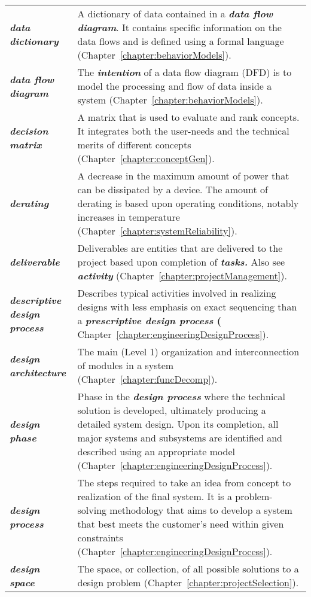 \begin{longtable} { p{3cm} p{11cm}}
\emph{\textbf{data dictionary}} & A dictionary of data contained in a
\emph{\textbf{data flow diagram}}. It contains specific information on
the data flows and is defined using a formal language (Chapter~\ref{chapter:behaviorModels}). \B \\
\emph{\textbf{data flow diagram}} & The \emph{\textbf{intention}} of a
data flow diagram (DFD) is to model the processing and flow of data
inside a system (Chapter~\ref{chapter:behaviorModels}). \B \\
\emph{\textbf{decision matrix}} & A matrix that is used to evaluate and
rank concepts. It integrates both the user-needs and the technical
merits of different concepts (Chapter~\ref{chapter:conceptGen}). \B \\
\emph{\textbf{derating}} & A decrease in the maximum amount of power
that can be dissipated by a device. The amount of derating is based upon
operating conditions, notably increases in temperature (Chapter~\ref{chapter:systemReliability}). \B \\
\emph{\textbf{deliverable}} & Deliverables are entities that are
delivered to the project based upon completion of \emph{\textbf{tasks.}}
Also see \emph{\textbf{activity}} (Chapter~\ref{chapter:projectManagement}). \B \\
\emph{\textbf{descriptive design process}} & Describes typical
activities involved in realizing designs with less emphasis on exact
sequencing than a \textbf{\emph{prescriptive design process} (}
Chapter~\ref{chapter:engineeringDesignProcess}). \B \\
\emph{\textbf{design architecture}} & The main (Level 1) organization
and interconnection of modules in a system (Chapter~\ref{chapter:funcDecomp}). \B \\
\emph{\textbf{design phase}} & Phase in the \emph{\textbf{design
process}} where the technical solution is developed, ultimately
producing a detailed system design. Upon its completion, all major
systems and subsystems are identified and described using an appropriate
model (Chapter~\ref{chapter:engineeringDesignProcess}). \B \\
\emph{\textbf{design process}} & The steps required to take an idea from
concept to realization of the final system. It is a problem-solving
methodology that aims to develop a system that best meets the customer's
need within given constraints (Chapter~\ref{chapter:engineeringDesignProcess}). \B \\
\emph{\textbf{design space}} & The space, or collection, of all possible
solutions to a design problem (Chapter~\ref{chapter:projectSelection}). \B \\

\end{longtable}
